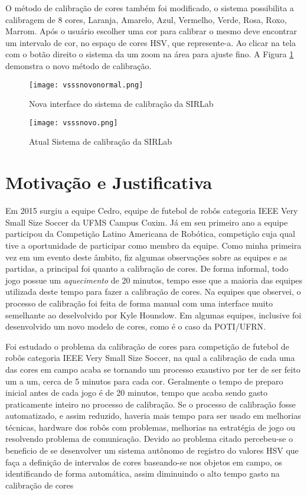 O método de calibração de cores também foi modificado, o sistema possibilita a calibragem de 8 cores, Laranja, Amarelo, Azul, Vermelho, Verde, Rosa, Roxo, Marrom\cite{VSSVision}. Após o usuário escolher uma cor para calibrar o mesmo deve encontrar um intervalo de cor, no espaço de cores HSV, que represente-a. Ao clicar na tela com o botão direito o sistema da um zoom na área para ajuste fino. A Figura \ref{SIRLabNovaCalibracao} demonstra o novo método de calibração.
\begin{figure}[H]
\begin{minipage}[H]{0.45\linewidth}
\hspace{0.5cm}
\centering
\texttt{[image: vsssnovonormal.png]}
\caption{Nova interface do sistema de calibração da SIRLab\cite{VSSVision}}
\label{SIRLabNova}
\end{minipage}
\hspace{0.5cm}
\begin{minipage}[H]{0.40\linewidth}
\centering
\texttt{[image: vsssnovo.png]}
\caption{Atual Sistema de calibração da SIRLab\cite{VSSVision}}
\label{SIRLabNovaCalibracao}
\end{minipage}
\end{figure}	

\section{Motivação e Justificativa}
Em 2015 surgiu a equipe Cedro, equipe de futebol de robôs categoria IEEE Very Small Size Soccer da UFMS Campus Coxim. Já em seu primeiro ano a equipe participou da Competição Latino Americana de Robótica, competição cuja qual tive a oportunidade de participar como membro da equipe. Como minha primeira vez em um evento deste âmbito, fiz algumas observações sobre as equipes e as partidas, a principal foi quanto a calibração de cores. De forma informal, todo jogo possue um \emph{aquecimento} de 20 minutos, tempo esse que a maioria das equipes utilizada deste tempo para fazer a calibração de cores. Na equipes que observei, o processo de calibração foi feita de forma manual com uma interface muito semelhante ao deselvolvido por Kyle Hounslow\cite{YouTube}. Em algumas equipes, inclusive foi desenvolvido um novo modelo de cores, como é o caso da POTI/UFRN\cite{Martins:2007}.

Foi estudado o problema da calibração de cores para competição de futebol de robôs categoria IEEE Very Small Size Soccer, na qual a calibração de cada uma das cores em campo acaba se tornando um processo exaustivo por ter de ser feito um a um, cerca de 5 minutos para cada cor. Geralmente o tempo de preparo inicial antes de cada jogo é de 20 minutos, tempo que acaba sendo gasto praticamente inteiro no processo de calibração. Se o processo de calibração fosse automatizado, e assim reduzido, haveria mais tempo para ser usado em melhorias técnicas, hardware dos robôs com problemas, melhorias na estratégia de jogo ou resolvendo problema de comunicação. Devido ao problema citado percebeu-se o beneficio de se desenvolver um sistema autônomo de registro do valores HSV que faça a definição de intervalos de cores baseando-se nos objetos em campo, os identificando de forma automática, assim diminuindo o alto tempo gasto na calibração de cores 
